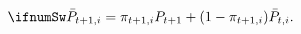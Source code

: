\begin{equation} \ifnumSw
  \bar{{P}}_{t+1,i} =\pi_{t+1,i} {P}_{t+1} +
  (1-\pi_{t+1,i})\bar{{P}}_{t,i} \label{eq:Pti}
.
\end{equation}
